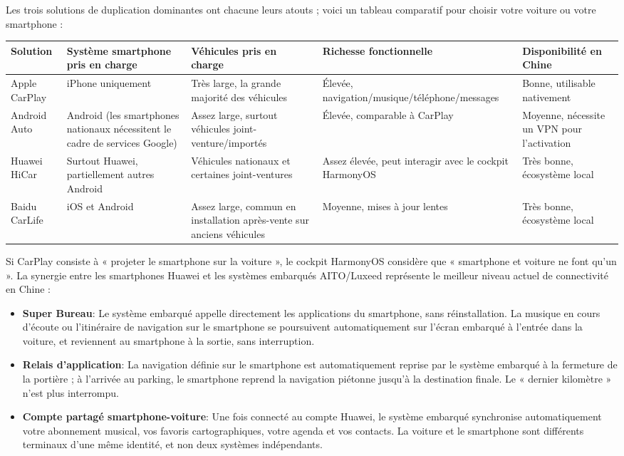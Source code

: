 Les trois solutions de duplication dominantes ont chacune leurs atouts ; voici un tableau comparatif pour choisir votre voiture ou votre smartphone :

\begin{center}
\begin{tabularx}{\linewidth}{|X|X|X|X|X|}
\hline
\textbf{Solution} & \textbf{Système smartphone pris en charge} & \textbf{Véhicules pris en charge} & \textbf{Richesse fonctionnelle} & \textbf{Disponibilité en Chine} \tabularnewline
\hline
Apple CarPlay & iPhone uniquement & Très large, la grande majorité des véhicules & Élevée, navigation/musique/téléphone/messages & Bonne, utilisable nativement \tabularnewline
Android Auto & Android (les smartphones nationaux nécessitent le cadre de services Google) & Assez large, surtout véhicules joint-venture/importés & Élevée, comparable à CarPlay & Moyenne, nécessite un VPN pour l'activation \tabularnewline
Huawei HiCar & Surtout Huawei, partiellement autres Android & Véhicules nationaux et certaines joint-ventures & Assez élevée, peut interagir avec le cockpit HarmonyOS & Très bonne, écosystème local \tabularnewline
Baidu CarLife & iOS et Android & Assez large, commun en installation après-vente sur anciens véhicules & Moyenne, mises à jour lentes & Très bonne, écosystème local \tabularnewline
\hline
\end{tabularx}
\end{center}


Si CarPlay consiste à « projeter le smartphone sur la voiture », le cockpit HarmonyOS considère que « smartphone et voiture ne font qu'un ». La synergie entre les smartphones Huawei et les systèmes embarqués AITO/Luxeed représente le meilleur niveau actuel de connectivité en Chine :

\begin{itemize}
  \item \textbf{Super Bureau}: Le système embarqué appelle directement les applications du smartphone, sans réinstallation. La musique en cours d'écoute ou l'itinéraire de navigation sur le smartphone se poursuivent automatiquement sur l'écran embarqué à l'entrée dans la voiture, et reviennent au smartphone à la sortie, sans interruption.
  \item \textbf{Relais d'application}: La navigation définie sur le smartphone est automatiquement reprise par le système embarqué à la fermeture de la portière ; à l'arrivée au parking, le smartphone reprend la navigation piétonne jusqu'à la destination finale. Le « dernier kilomètre » n'est plus interrompu.
  \item \textbf{Compte partagé smartphone-voiture}: Une fois connecté au compte Huawei, le système embarqué synchronise automatiquement votre abonnement musical, vos favoris cartographiques, votre agenda et vos contacts. La voiture et le smartphone sont différents terminaux d'une même identité, et non deux systèmes indépendants.
\end{itemize}

